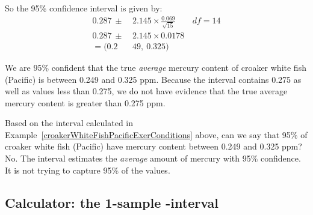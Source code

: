 \begin{examplewrap}
\begin{nexample}
\begin{description}
So the 95\% confidence interval is given by:
\begin{align*}
0.287 \ \pm\  &2.145\times  \frac{0.069}{\sqrt{15}}  \qquad df = 14\\
0.287 \ \pm\  &2.145\times 0.0178 \\
=(0.2&49,\ 0.325)
\end{align*}
\item[\inferencestep{Conclude}]  We are 95\% confident that the true \emph{average} mercury content of croaker white fish (Pacific) is between 0.249 and 0.325 ppm. Because the interval contains 0.275 as well as values less than 0.275, we do not have evidence that the true average mercury content is  greater than 0.275 ppm.
\end{description}
\end{nexample}
\end{examplewrap}


\begin{examplewrap}
\begin{nexample}
{Based on the interval calculated in Example~\ref{croakerWhiteFishPacificExerConditions} above, can we say that 95\% of croaker white fish (Pacific) have mercury content between 0.249 and 0.325 ppm?}
No.  The interval estimates the \emph{average} amount of mercury with 95\% confidence.  It is not trying to capture 95\% of the values.  
\end{nexample}
\end{examplewrap}


\D{\newpage}

\subsection[Calculator: the 1-sample $t$-interval]{Calculator: the 1-sample -interval}
\label{1SampTint}

